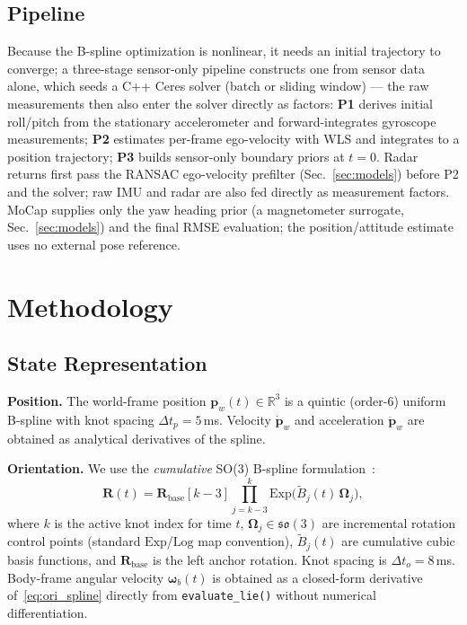 \documentclass[conference]{IEEEtran}
\newcommand{\vR}{\mathbf{R}}
\newcommand{\vp}{\mathbf{p}}
\newcommand{\vom}{\boldsymbol{\omega}}
\newcommand{\vOm}{\boldsymbol{\Omega}}
\newcommand{\so}{\mathfrak{so}(3)}
\newcommand{\Exp}{\mathrm{Exp}}
\newcommand{\Log}{\mathrm{Log}}
\begin{document}
\subsection{Pipeline}
Because the B-spline optimization is nonlinear, it needs an initial
trajectory to converge; a three-stage sensor-only pipeline constructs
one from sensor data alone, which seeds a C++ Ceres solver (batch or
sliding window) --- the raw measurements then also enter the solver
directly as factors:
\textbf{P1} derives initial roll/pitch from the stationary
accelerometer and forward-integrates gyroscope measurements;
\textbf{P2} estimates per-frame ego-velocity with WLS and integrates
to a position trajectory;
\textbf{P3} builds sensor-only boundary priors at $t=0$.
Radar returns first pass the RANSAC ego-velocity prefilter
(Sec.~\ref{sec:models}) before P2 and the solver; raw IMU and radar are
also fed directly as measurement factors. MoCap supplies only the yaw
heading prior (a magnetometer surrogate, Sec.~\ref{sec:models}) and the
final RMSE evaluation; the position/attitude estimate uses no external
pose reference.

\section{Methodology}
\label{sec:method}

\subsection{State Representation}
\label{sec:state}

\textbf{Position.}
The world-frame position $\vp_w(t) \in \mathbb{R}^3$ is a quintic
(order-6) uniform B-spline with knot spacing $\Delta t_p = 5$\,ms.
Velocity $\dot{\vp}_w$ and acceleration $\ddot{\vp}_w$ are
obtained as analytical derivatives of the spline.

\textbf{Orientation.}
We use the \emph{cumulative} SO(3) B-spline
formulation~\cite{sommer2020efficient}:
\begin{equation}
  \vR(t) = \vR_{\mathrm{base}}[k{-}3]
           \prod_{j=k-3}^{k} \Exp\!\bigl(\tilde{B}_j(t)\,\vOm_j\bigr),
  \label{eq:ori_spline}
\end{equation}
where $k$ is the active knot index for time $t$,
$\vOm_j \in \so$ are incremental rotation control points
(standard $\Exp$/$\Log$ map convention),
$\tilde{B}_j(t)$ are cumulative cubic basis functions, and
$\vR_{\mathrm{base}}$ is the left anchor rotation.  Knot spacing
is $\Delta t_o = 8$\,ms.  Body-frame angular velocity $\vom_b(t)$
is obtained as a closed-form derivative of~\eqref{eq:ori_spline}
directly from \texttt{evaluate\_lie()} without numerical
differentiation.
\end{document}
